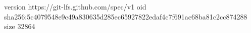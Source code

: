 version https://git-lfs.github.com/spec/v1
oid sha256:5c4079548e9c49a830635d285ec65927822edaf4c7f691ac68ba81c2cc874288
size 32864
